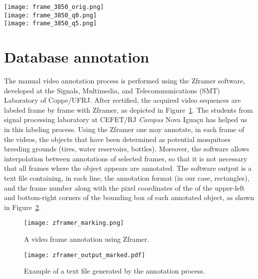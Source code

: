 \begin{figure*}[htb!]
	\centering
	\texttt{[image: frame\_3850\_orig.png]}\\
	\vspace{2mm}
	\texttt{[image: frame\_3850\_q0.png]}\\
	\vspace{2mm}
	\texttt{[image: frame\_3850\_q5.png]}
	\caption[Compression quality comparison]{Compression quality comparison. From up to down: frame from original video, quality = 0, and quality = 5.}
	\label{fig:compression_vis}
\end{figure*}

  \section{Database annotation}\label{sec:annot}
  The manual video annotation process is performed using the Zframer software, developed at the Signals, Multimedia, and Telecommunications (SMT)
   Laboratory of Coppe/UFRJ.
  After rectified, the acquired video sequences are labeled frame by frame with Zframer, as depicted in Figure~\ref{fig:zframer1}.
  The students from signal processing laboratory at CEFET/RJ {\it Campus} Nova Iguaçu has helped us in this labeling process.
  Using the Zframer one may annotate, in each frame of the videos, the objects that have been determined as potential mosquitoes breeding grounds (\eg tires, water reservoirs, bottles).
  Moreover, the software allows interpolation between annotations of selected frames, so that it is not necessary that all frames where the object appears are annotated.
  The software output is a text file containing, in each line, the annotation format (in our case, rectangles), and the frame number along with the pixel coordinates of the of the upper-left and bottom-right corners of the bounding box of each annotated object, as shown in Figure~\ref{fig:zframer_output}.
\begin{figure}[htb]
	\centering
	\texttt{[image: zframer\_marking.png]}%
	\caption{A video frame annotation using Zframer.}
	\label{fig:zframer1}
\end{figure}
%
\begin{figure}[htb]
	\centering
	\texttt{[image: zframer\_output\_marked.pdf]}
	\caption{Example of a text file generated by the annotation process.}
	\label{fig:zframer_output}
\end{figure}

